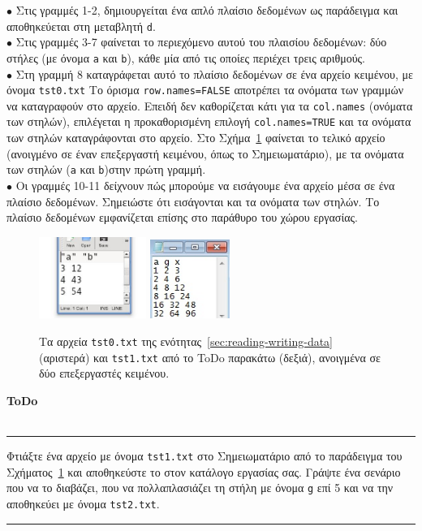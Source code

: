\documentclass[a4paper,10pt,twocolumn]{article}
\newenvironment{ToDo} {
  \begin{flushright}
    \hfill
    \begin{minipage}{0.9\columnwidth}
    \textsf{\textbf{ToDo}} \\
      \vspace{-0.7cm}\\
      {\color{Gray}\rule[-0.05cm]{\columnwidth}{1.5pt}}} {
      {\color{Gray}\rule[0.3cm]{\columnwidth}{1.5pt}}
    \end{minipage}
    \vspace{0.3cm}
  \end{flushright}
  }
\begin{document}
\noindent $\bullet$ Στις γραμμές 1-2, δημιουργείται ένα απλό πλαίσιο δεδομένων ως παράδειγμα και αποθηκεύεται 
στη μεταβλητή \texttt{d}. \\
\noindent $\bullet$ Στις γραμμές 3-7 φαίνεται το περιεχόμενο αυτού του πλαισίου δεδομένων: δύο στήλες (με 
όνομα \texttt{a} και \texttt{b}), κάθε μία από τις οποίες περιέχει τρεις αριθμούς.\\
\noindent $\bullet$ Στη γραμμή 8 καταγράφεται αυτό το πλαίσιο δεδομένων σε ένα αρχείο κειμένου, με όνομα
\texttt{tst0.txt} Το όρισμα \verb!row.names=FALSE! αποτρέπει τα ονόματα των γραμμών να καταγραφούν στο αρχείο.
Επειδή δεν καθορίζεται κάτι για τα \texttt{col.names} (ονόματα των στηλών), επιλέγεται η προκαθορισμένη επιλογή
\verb!col.names=TRUE! και τα ονόματα των στηλών καταγράφονται στο αρχείο. Στο Σχήμα~\ref{fig:tst0} φαίνεται το
τελικό αρχείο (ανοιγμένο σε έναν επεξεργαστή κειμένου, όπως το Σημειωματάριο), με τα ονόματα των στηλών
(\texttt{a} και \texttt{b})στην πρώτη γραμμή. \\
\noindent $\bullet$ Οι γραμμές 10-11 δείχνουν πώς μπορούμε να εισάγουμε ένα αρχείο μέσα σε ένα πλαίσιο
δεδομένων. Σημειώστε ότι εισάγονται και τα ονόματα των στηλών. Το πλαίσιο δεδομένων εμφανίζεται επίσης στο
παράθυρο του χώρου εργασίας.\\

\begin{figure}[h]
  \centering
  \includegraphics[width=3.5cm]{img/tst0.jpeg}
  \includegraphics[width=2.6cm]{img/tst1.jpg}
  \caption{Τα αρχεία \texttt{tst0.txt} της ενότητας~\ref{sec:reading-writing-data}
    (αριστερά) και \texttt{tst1.txt} από το ToDo παρακάτω (δεξιά), ανοιγμένα σε δύο επεξεργαστές κειμένου.}
  \label{fig:tst0}
\end{figure}

\begin{ToDo}
Φτιάξτε ένα αρχείο με όνομα \texttt{tst1.txt} στο Σημειωματάριο από το παράδειγμα του Σχήματος~\ref{fig:tst0}
και αποθηκεύστε το στον κατάλογο εργασίας σας. Γράψτε ένα σενάριο που να το διαβάζει, που να πολλαπλασιάζει
τη στήλη με όνομα \texttt{g} επί 5 και να την αποθηκεύει με όνομα \texttt{tst2.txt}.\\
\end{ToDo}
\end{document}
